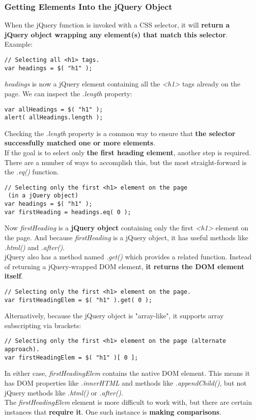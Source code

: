 \documentclass[10pt,letterpaper]{book}
\begin{document}
\subsubsection{Getting Elements Into the jQuery Object}
When the jQuery function is invoked with a CSS selector, it will \textbf{return a jQuery object wrapping any element(s) that match this selector}. Example:
\begin{lstlisting}
// Selecting all <h1> tags.
var headings = $( "h1" );
\end{lstlisting}
\textit{headings} is now a jQuery element containing all the \textit{<h1>} tags already on the page. We can inspect the \textit{.length} property:
\begin{lstlisting}
var allHeadings = $( "h1" );
alert( allHeadings.length );
\end{lstlisting}
Checking the \textit{.length} property is a common way to ensure that \textbf{the selector successfully matched one or more elements}.\\
If the goal is to select only \textbf{the first heading element}, another step is required. There are a number of ways to accomplish this, but the most straight-forward is the \textit{.eq()} function.
\begin{lstlisting}
// Selecting only the first <h1> element on the page
 (in a jQuery object)
var headings = $( "h1" );
var firstHeading = headings.eq( 0 );
\end{lstlisting}
Now \textit{firstHeading} is a \textbf{jQuery object} containing only the first \textit{<h1>} element on the page. And because \textit{firstHeading} is a jQuery object, it has useful methods like \textit{.html()} and \textit{.after()}.\\
jQuery also has a method named \textit{.get()} which provides a related function. Instead of returning a jQuery-wrapped DOM element, \textbf{it returns the DOM element itself}.
\begin{lstlisting}
// Selecting only the first <h1> element on the page.
var firstHeadingElem = $( "h1" ).get( 0 );
\end{lstlisting}
Alternatively, because the jQuery object is "array-like", it supports array subscripting via brackets:
\begin{lstlisting}
// Selecting only the first <h1> element on the page (alternate approach).
var firstHeadingElem = $( "h1" )[ 0 ];
\end{lstlisting}
In either case, \textit{firstHeadingElem} contains the native DOM element. This means it has DOM properties like \textit{.innerHTML} and methods like \textit{.appendChild()}, but not jQuery methods like \textit{.html()} or \textit{.after()}.\\
The \textit{firstHeadingElem} element is more difficult to work with, but there are certain instances that \textbf{require it}. One such instance is \textbf{making comparisons}.
\end{document}
